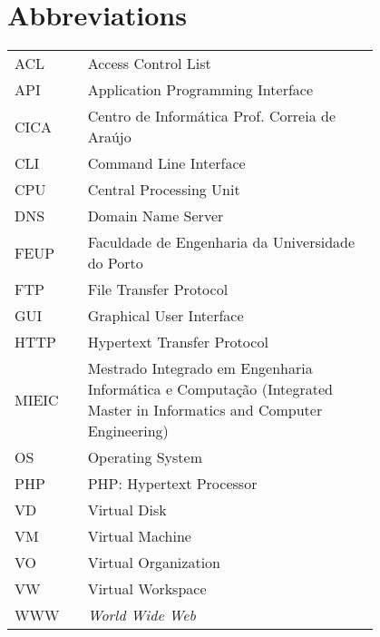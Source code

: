 \chapter*{Abbreviations}\label{chap:abbrev}

\begin{flushleft}
\begin{tabular}{l p{0.8\linewidth}}
ACL	 & Access Control List\\
API	 & Application Programming Interface\\
CICA	 & Centro de Informática Prof. Correia de Araújo\\
CLI	 & Command Line Interface\\
CPU	 & Central Processing Unit\\
DNS	 & Domain Name Server\\
FEUP	 & Faculdade de Engenharia da Universidade do Porto\\
FTP	 & File Transfer Protocol\\
GUI	 & Graphical User Interface\\
HTTP	 & Hypertext Transfer Protocol\\
MIEIC	 & Mestrado Integrado em Engenharia Informática e Computação (Integrated Master in Informatics and Computer Engineering)\\
OS	 & Operating System\\
PHP	 & PHP: Hypertext Processor\\
VD	 & Virtual Disk\\
VM	 & Virtual Machine\\
VO	 & Virtual Organization\\
VW	 & Virtual Workspace\\
WWW      & \emph{World Wide Web}
\end{tabular}
\end{flushleft}

